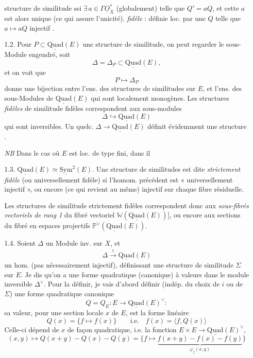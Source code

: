 \documentclass[11pt,a4paper]{article}
\begin{document}
structure de similitude ssi $\exists\, a \in \Gamma \underline{O}_X^*$ (globalement) telle que $Q' = aQ$, et cette $a$ est alors unique (ce qui assure l'unicité).   \emph{fidèle} : définie loc. par une $Q$ telle que $a \mapsto aQ$ injectif .

1.2.  Pour $P \subset \underline{\mathrm{Quad}}(E)$ une structure de similitude, on peut regarder le sous-Module engendré, soit
\[
  \Delta = \Delta_P \subset \underline{\mathrm{Quad}}(E),
\]
et on voit que
\[
  P \longmapsto \Delta_P
\]
donne une bijection entre l'ens. des structures de similitudes sur $E$, et l'ens. des sous-Modules de $\underline{\mathrm{Quad}}(E)$ qui sont localement monogènes.  Les structures \emph{fidèles} de similitude fidèles correspondent aux sous-modules
\[
  \Delta \hookrightarrow \underline{\mathrm{Quad}}(E)
\]
qui sont inversibles. Un  quelc. $\Delta \to \underline{\mathrm{Quad}}(E)$ définit évidemment une structure \ill{}.

\emph{NB} Dans le cas où \ill{} $E$ est loc. \ill{} de type fini, dans  il \ill{}

1.3. \ill{} \ill{} \ill{} $\underline{\mathrm{Quad}}(E) \simeq \underline{\mathrm{Sym}}^2(E)$. Une structure \ill{} de similitudes est dite \emph{strictement fidèle} (ou universellement fidèle) si l'homom. précédent est « universellement injectif », ou encore (ce qui revient au même) injectif sur chaque fibre résiduelle.

Les structures de similitude strictement fidèles correspondent donc aux \emph{sous-fibrés vectoriels de rang 1} du fibré vectoriel $\mathbb{W}(\underline{\mathrm{Quad}}(E))$], ou encore aux sections du fibré en espaces projectifs $\mathbb{P}^\vee(\underline{\mathrm{Quad}}(E))$.

1.4. Soient $\Delta$ un Module inv. sur $X$, et
\[
  \Delta \xrightarrow{\ i\ } \underline{\mathrm{Quad}}(E)
\]
un hom. (pas nécessairement injectif), définissant  une structure de similitude $\Sigma$ sur $E$. Je dis qu'on a une forme quadratique  (canonique) à valeurs dans le module inversible $\Delta^\vee$. Pour la définir, je vais d'abord définir (indép. du choix de $i$ ou de $\Sigma$) une forme quadratique canonique
\[
  Q = Q_E : E \longrightarrow \underline{\mathrm{Quad}}(E)^\vee :
\]
 sa valeur, pour une section locale $x$ de $E$, est la forme linéaire
\[
  Q(x) = \{ f \longmapsto f(x) \} \qquad \text{i.e.} \quad f(x) = \langle f, Q(x) \rangle
\]
  Celle-ci dépend de $x$ de façon quadratique, i.e. la fonction $E \times E \to \underline{\mathrm{Quad}}(E)^\vee$,
\[
  (x, y) \longmapsto Q(x + y) - Q(x) - Q(y) = \{ f \longmapsto \underbrace{f(x+y) - f(x) - f(y)}_{\varphi_f(x,y)} \}
\]
\end{document}

